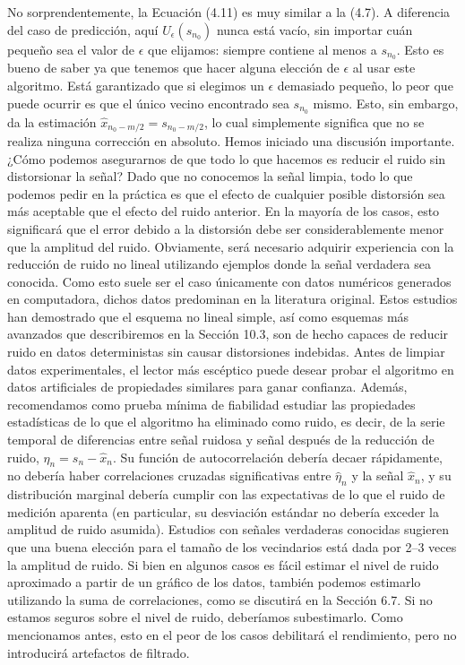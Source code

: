 \documentclass[10pt,a4paper]{book}
\begin{document}
No sorprendentemente, la Ecuación (4.11) es muy similar a la (4.7). A diferencia del caso de predicción, aquí $U_\epsilon(s_{n_0})$ nunca está vacío, sin importar cuán pequeño sea el valor de $\epsilon$ que elijamos: siempre contiene al menos a $s_{n_0}$. Esto es bueno de saber ya que tenemos que hacer alguna elección de $\epsilon$ al usar este algoritmo. Está garantizado que si elegimos un $\epsilon$ demasiado pequeño, lo peor que puede ocurrir es que el único vecino encontrado sea $s_{n_0}$ mismo. Esto, sin embargo, da la estimación $\hat{x}_{n_0-m/2} = s_{n_0-m/2}$, lo cual simplemente significa que no se realiza ninguna corrección en absoluto. Hemos iniciado una discusión importante. ¿Cómo podemos asegurarnos de que todo lo que hacemos es reducir el ruido sin distorsionar la señal? Dado que no conocemos la señal limpia, todo lo que podemos pedir en la práctica es que el efecto de cualquier posible distorsión sea más aceptable que el efecto del ruido anterior. En la mayoría de los casos, esto significará que el error debido a la distorsión debe ser considerablemente menor que la amplitud del ruido. Obviamente, será necesario adquirir experiencia con la reducción de ruido no lineal utilizando ejemplos donde la señal verdadera sea conocida. Como esto suele ser el caso únicamente con datos numéricos generados en computadora, dichos datos predominan en la literatura original. Estos estudios han demostrado que el esquema no lineal simple, así como esquemas más avanzados que describiremos en la Sección 10.3, son de hecho capaces de reducir ruido en datos deterministas sin causar distorsiones indebidas. Antes de limpiar datos experimentales, el lector más escéptico puede desear probar el algoritmo en datos artificiales de propiedades similares para ganar confianza. Además, recomendamos como prueba mínima de fiabilidad estudiar las propiedades estadísticas de lo que el algoritmo ha eliminado como ruido, es decir, de la serie temporal de diferencias entre señal ruidosa y señal después de la reducción de ruido, $\hat{\eta}_n = s_n - \hat{x}_n$. Su función de autocorrelación debería decaer rápidamente, no debería haber correlaciones cruzadas significativas entre $\hat{\eta}_n$ y la señal $\hat{x}_n$, y su distribución marginal debería cumplir con las expectativas de lo que el ruido de medición aparenta (en particular, su desviación estándar no debería exceder la amplitud de ruido asumida). Estudios con señales verdaderas conocidas sugieren que una buena elección para el tamaño de los vecindarios está dada por 2--3 veces la amplitud de ruido. Si bien en algunos casos es fácil estimar el nivel de ruido aproximado a partir de un gráfico de los datos, también podemos estimarlo utilizando la suma de correlaciones, como se discutirá en la Sección 6.7. Si no estamos seguros sobre el nivel de ruido, deberíamos subestimarlo. Como mencionamos antes, esto en el peor de los casos debilitará el rendimiento, pero no introducirá artefactos de filtrado.
\end{document}
